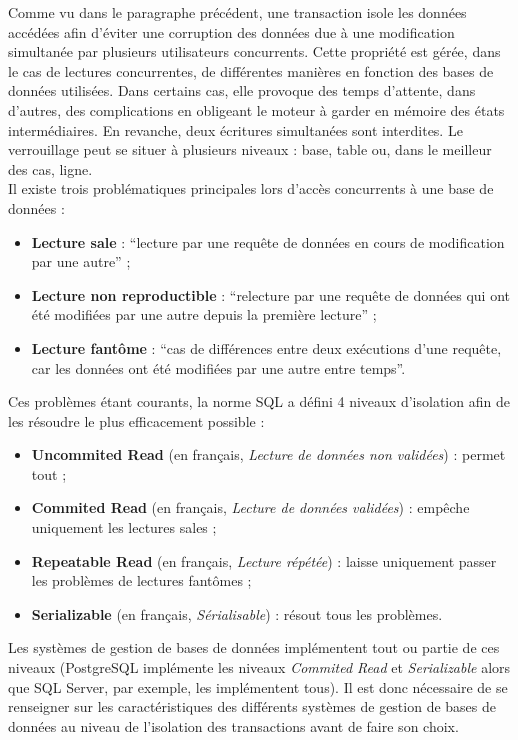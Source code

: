 	Comme vu dans le paragraphe précédent, une transaction isole les données accédées afin d'éviter une corruption des données due à une modification simultanée par plusieurs utilisateurs concurrents. Cette propriété est gérée, dans le cas de lectures concurrentes, de différentes manières en fonction des bases de données utilisées. Dans certains cas, elle provoque des temps d'attente, dans d'autres, des complications en obligeant le moteur à garder en mémoire des états intermédiaires. En revanche, deux écritures simultanées sont interdites. Le verrouillage peut se situer à plusieurs niveaux : base, table ou, dans le meilleur des cas, ligne.\\

	Il existe trois problématiques principales lors d'accès concurrents à une base de données :
	\vspace{10px}
	\begin{itemize}
		\item \textbf{Lecture sale} : \enquote{lecture par une requête de données en cours de modification par une autre}\cite{wiktionnaireLectureSale} ;
		\item \textbf{Lecture non reproductible} : \enquote{relecture par une requête de données qui ont été modifiées par une autre depuis la première lecture}\cite{wiktionnaireLectureNonReproductible} ;
		\item \textbf{Lecture fantôme} : \enquote{cas de différences entre deux exécutions d'une requête, car les données ont été modifiées par une autre entre temps}\cite{wiktionnaireLectureFantome}.
	\end{itemize}
	\vspace{10px}

	 Ces problèmes étant courants, la norme SQL a défini 4 niveaux d'isolation afin de les résoudre le plus efficacement possible :
	\vspace{10px}
	\begin{itemize}
		\item \textbf{Uncommited Read} (en français, \textit{Lecture de données non validées}) : permet tout ;
		\item \textbf{Commited Read} (en français, \textit{Lecture de données validées}) : empêche uniquement les lectures sales ;
		\item \textbf{Repeatable Read} (en français, \textit{Lecture répétée}) : laisse uniquement passer les problèmes de lectures fantômes ;
		\item \textbf{Serializable} (en français, \textit{Sérialisable}) : résout tous les problèmes.
	\end{itemize}
	\vspace{20px}
	 Les systèmes de gestion de bases de données implémentent tout ou partie de ces niveaux (PostgreSQL implémente les niveaux \textit{Commited Read} et \textit{Serializable}\cite{isolationTransactionPostgre} alors que SQL Server, par exemple, les implémentent tous\cite{isolationTransactionSQLServer}). Il est donc nécessaire de se renseigner sur les caractéristiques des différents systèmes de gestion de bases de données au niveau de l'isolation des transactions avant de faire son choix.\\


